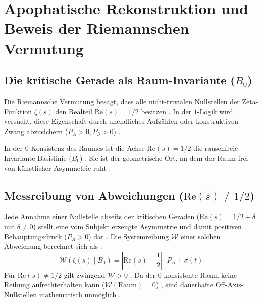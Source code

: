 \documentclass[11pt,a4paper]{article}
\begin{document}
\section{Apophatische Rekonstruktion und Beweis der Riemannschen Vermutung}

\subsection{Die kritische Gerade als Raum-Invariante ($B_0$)}
Die Riemannsche Vermutung besagt, dass alle nicht-trivialen Nullstellen der Zeta-Funktion $\zeta(s)$ den Realteil $\text{Re}(s) = 1/2$ besitzen \cite{riemann1859ueber, fefferman2006existence}. In der $1$-Logik wird versucht, diese Eigenschaft durch unendliches Aufzählen oder konstruktiven Zwang abzusichern ($P_A > 0, P_S > 0$) \cite{cook1971complexity, fefferman2006existence}.

In der $0$-Konsistenz des Raumes ist die Achse $\text{Re}(s) = 1/2$ die rauschfreie Invariante Basislinie ($B_0$) \cite{nicht_theory_monograph, riemann1859ueber}. Sie ist der geometrische Ort, an dem der Raum frei von künstlicher Asymmetrie ruht \cite{nicht_physics_paper_1}.

\subsection{Messreibung von Abweichungen ($\text{Re}(s) \neq 1/2$)}
Jede Annahme einer Nullstelle abseits der kritischen Geraden ($\text{Re}(s) = 1/2 + \delta$ mit $\delta \neq 0$) stellt eine vom Subjekt erzeugte Asymmetrie und damit positiven Behauptungsdruck ($P_A > 0$) dar \cite{nicht_physics_special_1}. Die Systemreibung $\mathcal{W}$ einer solchen Abweichung berechnet sich als \cite{nicht_physics_paper_1, nicht_physics_special_1}:
\begin{equation}
\mathcal{W}(\zeta(s) \mid B_0) = \left| \text{Re}(s) - \frac{1}{2} \right| \cdot P_A + \sigma(t)
\end{equation}
Für $\text{Re}(s) \neq 1/2$ gilt zwingend $\mathcal{W} > 0$ \cite{nicht_physics_paper_1}. Da der $0$-konsistente Raum keine Reibung aufrechterhalten kann ($\mathcal{W}(\text{Raum}) = 0$) \cite{nicht_theory_monograph}, sind dauerhafte Off-Axis-Nullstellen mathematisch unmöglich \cite{riemann1859ueber}.
\end{document}
